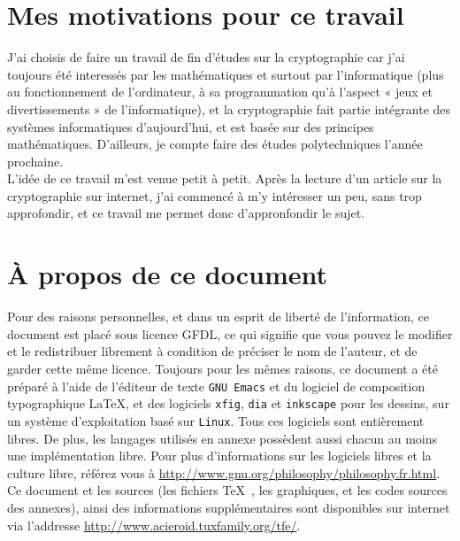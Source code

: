 
\section{Mes motivations pour ce travail}
J'ai choisis de faire un travail de fin d'études sur la cryptographie
car j'ai toujours été interessés par les mathématiques et surtout par
l'informatique (plus au fonctionnement de l'ordinateur, à sa
programmation qu'à l'aspect « jeux et divertissements » de
l'informatique), et la cryptographie fait partie intégrante des
systèmes informatiques d'aujourd'hui, et est basée sur des principes
mathématiques. D'ailleurs, je compte faire des études polytechniques
l'année prochaine. \\ L'idée de ce travail m'est venue petit à
petit. Après la lecture d'un article sur la cryptographie sur
internet, j'ai commencé à m'y intéresser un peu, sans trop
approfondir, et ce travail me permet donc
d'appronfondir le sujet.

\section{À propos de ce document} Pour des raisons personnelles, et
dans un esprit de liberté de l'information, ce document est placé sous
licence GFDL, ce qui signifie que vous pouvez le modifier et le
redistribuer librement à condition de préciser le nom de l'auteur, et
de garder cette même licence. Toujours pour les mêmes raisons, ce
document a été préparé à l'aide de l'éditeur de texte \texttt{GNU
  Emacs} et du logiciel de composition typographique \LaTeX, et des
logiciels \texttt{xfig}, \texttt{dia} et \texttt{inkscape} pour les
dessins, sur un système d'exploitation basé sur \texttt{Linux}. Tous
ces logiciels sont entièrement libres. De plus, les langages utilisés
en annexe possèdent aussi chacun au moins une implémentation
libre. Pour plus d'informations sur les logiciels libres et la culture
libre, référez vous à \url{http://www.gnu.org/philosophy/philosophy.fr.html}. \\
Ce document et les sources (les fichiers \TeX~, les graphiques, et les
codes sources des annexes), ainsi des informations supplémentaires
sont disponibles sur internet via l'addresse
\url{http://www.acieroid.tuxfamily.org/tfe/}. \\
